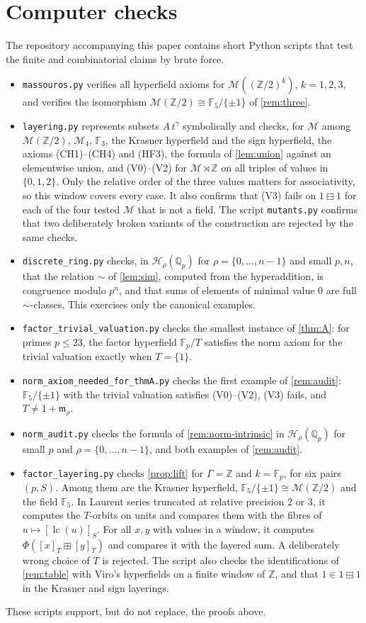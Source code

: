 \documentclass[11pt]{amsart}
\numberwithin{equation}{section}
\newcommand{\hplus}{\boxplus}
\newcommand{\hminus}{\boxminus}
\newcommand{\m}{\mathfrak m}
\newcommand{\Hr}{\mathcal H_\rho}
\newcommand{\Mas}{\mathcal M}
\newcommand{\Z}{\mathbb Z}
\newcommand{\F}{\mathbb F}
\newcommand{\cls}[1]{[#1]}
\newcommand{\lt}[2]{#1\,t^{#2}}
\begin{document}
\section{Computer checks}\label{sec:checks}

The repository accompanying this paper contains short Python scripts that test the finite and combinatorial claims by brute force.
\begin{itemize}
\item \texttt{massouros.py} verifies all hyperfield axioms for $\Mas((\Z/2)^k)$, $k=1,2,3$, and verifies the isomorphism $\Mas(\Z/2)\cong\F_5/\{\pm1\}$ of \cref{rem:three}.
\item \texttt{layering.py} represents subsets $\lt{A}{\gamma}$ symbolically and checks, for $\Mas$ among $\Mas(\Z/2)$, $\Mas_4$, $\F_3$, the Krasner hyperfield and the sign hyperfield, the axioms (CH1)--(CH4) and (HF3), the formula of \cref{lem:union} against an elementwise union, and (V0)--(V2) for $\Mas\rtimes\Z$ on all triples of values in $\{0,1,2\}$. Only the relative order of the three values matters for associativity, so this window covers every case. It also confirms that (V3) fails on $1\hminus1$ for each of the four tested $\Mas$ that is not a field. The script \texttt{mutants.py} confirms that two deliberately broken variants of the construction are rejected by the same checks.
\item \texttt{discrete\_ring.py} checks, in $\Hr(\mathbb Q_p)$ for $\rho=\{0,\dots,n-1\}$ and small $p,n$, that the relation $\sim$ of \cref{lem:sim}, computed from the hyperaddition, is congruence modulo $p^n$, and that sums of elements of minimal value $0$ are full $\sim$-classes. This exercises only the canonical examples.
\item \texttt{factor\_trivial\_valuation.py} checks the smallest instance of \cref{thm:A}: for primes $p\le23$, the factor hyperfield $\F_p/T$ satisfies the norm axiom for the trivial valuation exactly when $T=\{1\}$.
\item \texttt{norm\_axiom\_needed\_for\_thmA.py} checks the first example of \cref{rem:audit}: $\F_5/\{\pm1\}$ with the trivial valuation satisfies (V0)--(V2), (V3) fails, and $T\ne1+\m_\rho$.
\item \texttt{norm\_audit.py} checks the formula of \cref{rem:norm-intrinsic} in $\Hr(\mathbb Q_p)$ for small $p$ and $\rho=\{0,\dots,n-1\}$, and both examples of \cref{rem:audit}.
\item \texttt{factor\_layering.py} checks \cref{prop:lift} for $\Gamma=\Z$ and $k=\F_p$, for six pairs $(p,S)$. Among them are the Krasner hyperfield, $\F_5/\{\pm1\}\cong\Mas(\Z/2)$ and the field $\F_5$. In Laurent series truncated at relative precision $2$ or $3$, it computes the $T$-orbits on units and compares them with the fibres of $u\mapsto\cls{\operatorname{lc}(u)}_S$. For all $x,y$ with values in a window, it computes $\Phi(\cls x_T\hplus\cls y_T)$ and compares it with the layered sum. A deliberately wrong choice of $T$ is rejected. The script also checks the identifications of \cref{rem:table} with Viro's hyperfields on a finite window of $\Z$, and that $1\in1\hminus1$ in the Krasner and sign layerings.
\end{itemize}
These scripts support, but do not replace, the proofs above.
\end{document}
